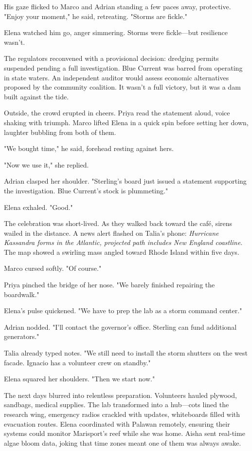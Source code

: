 His gaze flicked to Marco and Adrian standing a few paces away, protective. "Enjoy your moment," he said, retreating. "Storms are fickle."

Elena watched him go, anger simmering. Storms were fickle—but resilience wasn't.

\bigskip

The regulators reconvened with a provisional decision: dredging permits suspended pending a full investigation. Blue Current was barred from operating in state waters. An independent auditor would assess economic alternatives proposed by the community coalition. It wasn't a full victory, but it was a dam built against the tide.

Outside, the crowd erupted in cheers. Priya read the statement aloud, voice shaking with triumph. Marco lifted Elena in a quick spin before setting her down, laughter bubbling from both of them.

"We bought time," he said, forehead resting against hers.

"Now we use it," she replied.

Adrian clasped her shoulder. "Sterling's board just issued a statement supporting the investigation. Blue Current's stock is plummeting."

Elena exhaled. "Good."

The celebration was short-lived. As they walked back toward the café, sirens wailed in the distance. A news alert flashed on Talia's phone: \textit{Hurricane Kassandra forms in the Atlantic, projected path includes New England coastline}. The map showed a swirling mass angled toward Rhode Island within five days.

Marco cursed softly. "Of course."

Priya pinched the bridge of her nose. "We barely finished repairing the boardwalk."

Elena's pulse quickened. "We have to prep the lab as a storm command center."

Adrian nodded. "I'll contact the governor's office. Sterling can fund additional generators."

Talia already typed notes. "We still need to install the storm shutters on the west facade. Ignacio has a volunteer crew on standby."

Elena squared her shoulders. "Then we start now."

\bigskip

The next days blurred into relentless preparation. Volunteers hauled plywood, sandbags, medical supplies. The lab transformed into a hub—cots lined the research wing, emergency radios crackled with updates, whiteboards filled with evacuation routes. Elena coordinated with Palawan remotely, ensuring their systems could monitor Marisport's reef while she was home. Aisha sent real-time algae bloom data, joking that time zones meant one of them was always awake.

